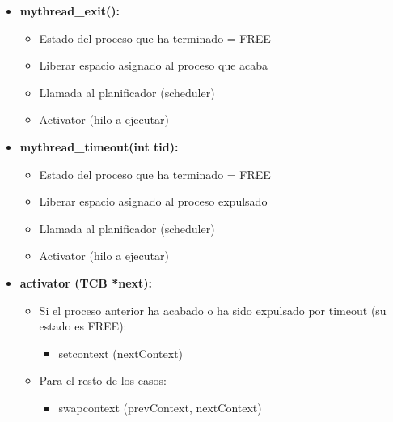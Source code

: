 \documentclass[10pt, spanish, pdftex]{template/UC3M_document}
\begin{document}
\begin{itemize}
    \item \textbf{mythread\_exit():}
     \vspace{-2mm}
    \begin{itemize}
     \setlength{\itemsep}{-1.5mm}
        \item Estado del proceso que ha terminado = FREE
        \item Liberar espacio asignado al proceso que acaba
        \item Llamada al planificador (scheduler)
        \item Activator (hilo a ejecutar)
    \end{itemize}
    \item \textbf{mythread\_timeout(int tid):}
    \vspace{-2mm}
    \begin{itemize}
     \setlength{\itemsep}{-1.5mm}
        \item Estado del proceso que ha terminado = FREE
        \item Liberar espacio asignado al proceso expulsado
        \item Llamada al planificador (scheduler)
        \item Activator (hilo a ejecutar)
    \end{itemize}
    \item \textbf{activator (TCB *next):}
    \vspace{-2mm}
    \begin{itemize}
     \setlength{\itemsep}{-1.5mm}
        \item Si el proceso anterior ha acabado o ha sido expulsado por timeout (su estado es FREE):
        \vspace{-2mm}
        \begin{itemize}
        \setlength{\itemsep}{-1.5mm}
            \item setcontext (nextContext)
        \end{itemize}
        \item Para el resto de los casos:
        \vspace{-2mm}
        \begin{itemize}
            \setlength{\itemsep}{-1.5mm}
            \item swapcontext (prevContext, nextContext)
        \end{itemize}
    \end{itemize}
\end{itemize}
\end{document}
